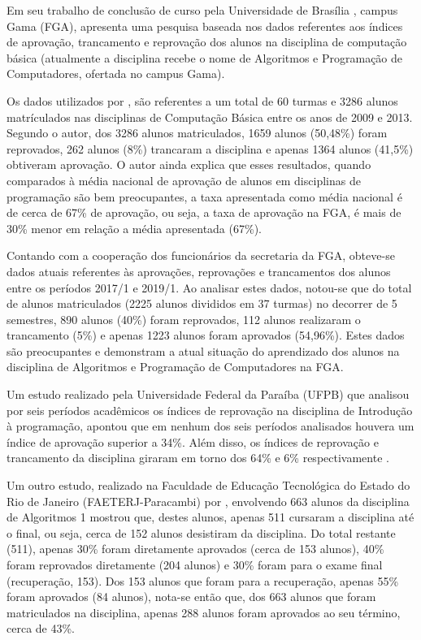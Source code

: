 Em seu trabalho de conclusão de curso pela Universidade de Brasília , campus Gama (FGA),  apresenta uma pesquisa 
baseada nos dados referentes aos índices de aprovação, trancamento e reprovação dos alunos na disciplina de computação básica (atualmente
a disciplina recebe o nome de Algoritmos e Programação de Computadores, ofertada no campus Gama). 

Os dados utilizados por , são referentes a um total de 60 turmas e 3286 alunos matrículados nas disciplinas de Computação Básica entre
os anos de 2009 e 2013. Segundo o autor, dos 3286 alunos matriculados, 1659 alunos (50,48\%) foram reprovados, 262 alunos (8\%) trancaram
a disciplina e apenas 1364 alunos (41,5\%) obtiveram aprovação. O autor ainda explica que esses resultados, quando comparados à média nacional de 
aprovação de alunos em disciplinas de programação são bem preocupantes, a taxa apresentada como média nacional é de cerca de 67\% de aprovação, ou 
seja, a taxa de aprovação na FGA, é mais de 30\% menor em relação a média apresentada (67\%).

Contando com a cooperação dos funcionários da secretaria da FGA, obteve-se dados atuais referentes às aprovações, reprovações e trancamentos dos
alunos entre os períodos 2017/1 e 2019/1. Ao analisar estes dados, notou-se que do total de alunos matriculados (2225 alunos divididos em 37 turmas) no decorrer
de 5 semestres, 890 alunos (40\%) foram reprovados, 112 alunos realizaram o trancamento (5\%) e apenas 1223 alunos foram aprovados (54,96\%). Estes dados são preocupantes 
e demonstram a atual situação do aprendizado dos alunos na disciplina de Algoritmos e Programação de Computadores na FGA.

Um estudo realizado pela Universidade Federal da Paraíba (UFPB) que analisou por seis períodos 
acadêmicos os índices de reprovação na disciplina de Introdução à programação, apontou que 
em nenhum dos seis períodos analisados houvera um índice de aprovação superior a 34\%. Além disso,
os índices de reprovação e trancamento da disciplina giraram em torno dos 64\% e 6\% respectivamente \cite{SBIE6739}.

Um outro estudo, realizado na Faculdade de Educação Tecnológica do Estado do Rio de Janeiro (FAETERJ-Paracambi) por , 
envolvendo 663 alunos da disciplina de Algoritmos 1 mostrou que, destes alunos, apenas 511 cursaram a disciplina 
até o final, ou seja, cerca de 152 alunos desistiram da disciplina. Do total restante (511), apenas 30\% foram
diretamente aprovados (cerca de 153 alunos), 40\% foram reprovados diretamente (204 alunos) e 30\% foram para o exame final (recuperação, 153).
Dos 153 alunos que foram para a recuperação, apenas 55\% foram aprovados (84 alunos), nota-se então que, dos 663 alunos que
foram matriculados na disciplina, apenas  288 alunos foram aprovados ao seu término, cerca de 43\%.

